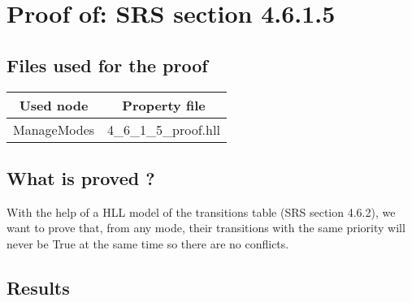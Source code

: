 \section{Proof of: SRS section 4.6.1.5}
\subsection{Files used for the proof}
\begin{tabular}{|c|c|}
\hline
Used node & Property file \\ \hline
ManageModes & 4\_6\_1\_5\_proof.hll \\
\hline
\end{tabular}

\subsection{What is proved ?}
With the help of a HLL model of the transitions table (SRS section
4.6.2), we want to prove that, from any mode, their transitions with
the same priority will never be True at the same time so there are no
conflicts.




\subsection{Results}
